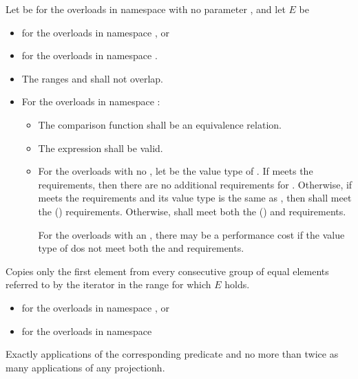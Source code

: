 \begin{itemdescr}
\pnum
Let  be  for the overloads in
namespace  with no parameter , and let $E$ be
\begin{itemize}
\item {}
  for the overloads in namespace , or
\item {}
  for the overloads in namespace .
\end{itemize}

\pnum
\requires
\begin{itemize}
\item
The ranges
and
shall not overlap.

\item
For the overloads in namespace :
\begin{itemize}
\item
The comparison function shall be an equivalence relation.

\item
The expression
shall be valid.

\item
For the overloads with no ,
let  be the value type of .
If  meets the  requirements,
then there are no additional requirements for .
Otherwise, if  meets the 
requirements and its value type is the same as ,
then  shall meet the  () requirements.
Otherwise,  shall meet both the
 () and  requirements.
\begin{note}
For the overloads with an , there may be a performance
cost if the value type of  dos not meet both the
 and  requirements.
\end{note}
\end{itemize}
\end{itemize}

\pnum
\effects
Copies only the first element from every consecutive group of equal elements referred to by
the iterator
in the range
for which $E$ holds.

\pnum
\returns
\begin{itemize}
\item {} for the overloads in namespace , or
\item {} for the overloads in namespace 
\end{itemize}

\pnum
\complexity
Exactly
applications of the corresponding predicate
and no more than twice as many applications of any projectionh.
\end{itemdescr}


